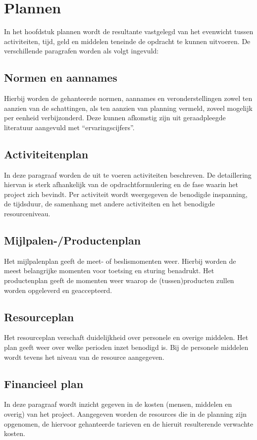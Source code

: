 \section{Plannen}
In het hoofdstuk plannen wordt de resultante vastgelegd van het evenwicht tussen activiteiten, tijd,
geld en middelen teneinde de opdracht te kunnen uitvoeren.
De verschillende paragrafen worden als volgt ingevuld:

\subsection{Normen en aannames}
Hierbij worden de gehanteerde normen, aannames en veronderstellingen zowel ten aanzien van de schattingen,
als ten aanzien van planning vermeld, zoveel mogelijk per eenheid verbijzonderd.
Deze kunnen afkomstig zijn uit geraadpleegde literatuur aangevuld met ``ervaringscijfers''.

\subsection{Activiteitenplan}
In deze paragraaf worden de uit te voeren activiteiten beschreven.
De detaillering hiervan is sterk afhankelijk van de opdrachtformulering en de fase waarin het project zich bevindt.
Per activiteit wordt weergegeven de benodigde inspanning, de tijdsduur,
de samenhang met andere activiteiten en het benodigde resourceniveau.

\subsection{Mijlpalen-/Productenplan}
Het mijlpalenplan geeft de meet- of beslismomenten weer.
Hierbij worden de meest belangrijke momenten voor toetsing en sturing benadrukt.
Het productenplan geeft de momenten weer waarop de (tussen)producten zullen worden opgeleverd en geaccepteerd.

\subsection{Resourceplan}
Het resourceplan verschaft duidelijkheid over personele en overige middelen.
Het plan geeft weer over welke perioden inzet benodigd is. Bij de personele middelen wordt tevens het niveau van de resource aangegeven.

\subsection{Financieel plan}
In deze paragraaf wordt inzicht gegeven in de kosten (mensen, middelen en overig) van het project.
Aangegeven worden de resources die in de planning zijn opgenomen,
de hiervoor gehanteerde tarieven en de hieruit resulterende verwachte kosten.\
